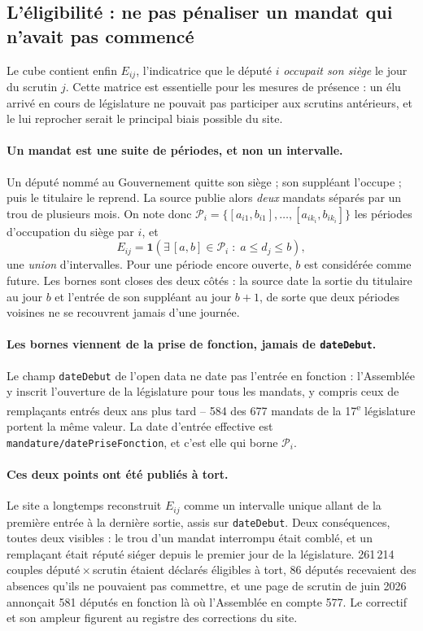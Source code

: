 \documentclass[11pt,a4paper]{article}
\newcommand{\ind}{\mathbf{1}}
\newcommand{\code}[1]{\texttt{#1}}
\begin{document}
\subsection{L'éligibilité : ne pas pénaliser un mandat qui n'avait pas commencé}
\label{sec:eligibilite}

Le cube contient enfin $E_{ij}$, l'indicatrice que le député $i$ \emph{occupait
son siège} le jour du scrutin $j$. Cette matrice est essentielle pour les
mesures de présence : un élu arrivé en cours de législature ne pouvait pas
participer aux scrutins antérieurs, et le lui reprocher serait le principal
biais possible du site.

\paragraph{Un mandat est une suite de périodes, et non un intervalle.}
Un député nommé au Gouvernement quitte son siège ; son suppléant l'occupe ;
puis le titulaire le reprend. La source publie alors \emph{deux} mandats
séparés par un trou de plusieurs mois. On note donc
$\mathcal{P}_i=\{[a_{i1},b_{i1}],\dots,[a_{ik_i},b_{ik_i}]\}$ les périodes
d'occupation du siège par $i$, et
\[
 E_{ij}=\ind\!\left(\exists\,[a,b]\in\mathcal{P}_i \;:\;
 a\leq d_j\leq b\right),
\]
une \emph{union} d'intervalles. Pour une période encore ouverte, $b$ est
considérée comme future. Les bornes sont closes des deux côtés : la source date
la sortie du titulaire au jour $b$ et l'entrée de son suppléant au jour $b+1$,
de sorte que deux périodes voisines ne se recouvrent jamais d'une journée.

\paragraph{Les bornes viennent de la prise de fonction, jamais de
\code{dateDebut}.} Le champ \code{dateDebut} de l'open data ne date pas
l'entrée en fonction : l'Assemblée y inscrit l'ouverture de la législature pour
tous les mandats, y compris ceux de remplaçants entrés deux ans plus tard --
584 des 677 mandats de la 17\textsuperscript{e} législature portent la même
valeur. La date d'entrée effective est \code{mandature/datePriseFonction}, et
c'est elle qui borne $\mathcal{P}_i$.

\paragraph{Ces deux points ont été publiés à tort.} Le site a longtemps
reconstruit $E_{ij}$ comme un intervalle unique allant de la première entrée à
la dernière sortie, assis sur \code{dateDebut}. Deux conséquences, toutes deux
visibles : le trou d'un mandat interrompu était comblé, et un remplaçant était
réputé siéger depuis le premier jour de la législature. 261\,214 couples
député\,$\times$\,scrutin étaient déclarés éligibles à tort, 86 députés
recevaient des absences qu'ils ne pouvaient pas commettre, et une page de
scrutin de juin 2026 annonçait 581 députés en fonction là où l'Assemblée en
compte 577. Le correctif et son ampleur figurent au registre des corrections du
site.
\end{document}
